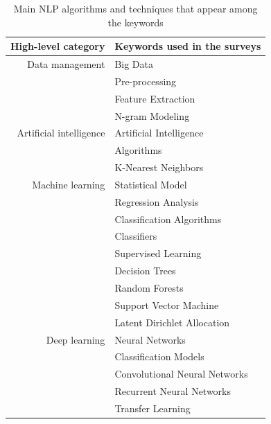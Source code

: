 \begin{table}[hbp]
    \centering
    \caption{Main NLP algorithms and techniques that appear among the keywords}
    \begin{tabular}{rl}
        High-level category     & Keywords used in the surveys  \\
        \toprule
        Data management         & Big Data                      \\
                                & Pre-processing                \\
                                & Feature Extraction            \\
                                & N-gram Modeling               \\
        Artificial intelligence & Artificial Intelligence       \\
                                & Algorithms                    \\
                                & K-Nearest Neighbors           \\
        Machine learning        & Statistical Model             \\
                                & Regression Analysis           \\
                                & Classification Algorithms     \\
                                & Classifiers                   \\
                                & Supervised Learning           \\
                                & Decision Trees                \\
                                & Random Forests                \\
                                & Support Vector Machine        \\
                                & Latent Dirichlet Allocation   \\
        Deep learning           & Neural Networks               \\
                                & Classification Models         \\
                                & Convolutional Neural Networks \\
                                & Recurrent Neural Networks     \\
                                & Transfer Learning             \\
        \bottomrule
    \end{tabular}
    \label{table:nlp-tools}
\end{table}

